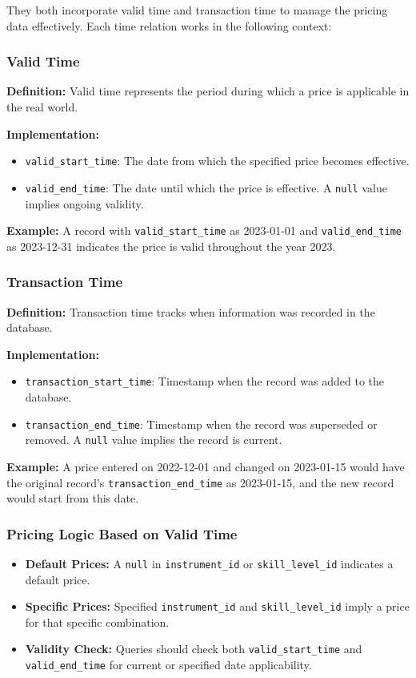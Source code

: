 \documentclass[a4paper]{scrartcl}
\begin{document}
They both incorporate valid time and transaction time to manage the pricing data effectively.
Each time relation works in the following context:

\subsubsection*{Valid Time}
\textbf{Definition:} Valid time represents the period during which a price is applicable in the real world.

\noindent\textbf{Implementation:}
\begin{itemize}
  \item \texttt{valid\_start\_time}: The date from which the specified price becomes effective.
  \item \texttt{valid\_end\_time}: The date until which the price is effective. A \texttt{null} value implies ongoing validity.
\end{itemize}

\textbf{Example:} A record with \texttt{valid\_start\_time} as 2023-01-01 and \texttt{valid\_end\_time} as 2023-12-31 indicates the price is valid throughout the year 2023.

\subsubsection*{Transaction Time}
\textbf{Definition:} Transaction time tracks when information was recorded in the database.

\noindent\textbf{Implementation:}
\begin{itemize}
  \item \texttt{transaction\_start\_time}: Timestamp when the record was added to the database.
  \item \texttt{transaction\_end\_time}: Timestamp when the record was superseded or removed. A \texttt{null} value implies the record is current.
\end{itemize}

\textbf{Example:} A price entered on 2022-12-01 and changed on 2023-01-15 would have the original record's \texttt{transaction\_end\_time} as 2023-01-15, and the new record would start from this date.

\subsubsection*{Pricing Logic Based on Valid Time}
\begin{itemize}
  \item \textbf{Default Prices:} A \texttt{null} in \texttt{instrument\_id} or \texttt{skill\_level\_id} indicates a default price.
  \item \textbf{Specific Prices:} Specified \texttt{instrument\_id} and \texttt{skill\_level\_id} imply a price for that specific combination.
  \item \textbf{Validity Check:} Queries should check both \texttt{valid\_start\_time} and \texttt{valid\_end\_time} for current or specified date applicability.
\end{itemize}
\end{document}
